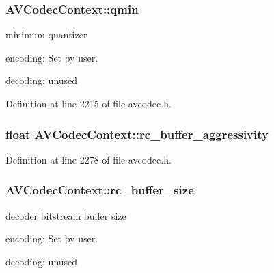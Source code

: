 \subsubsection[{\texorpdfstring{qmin}{qmin}}]{ A\+V\+Codec\+Context\+::qmin}\hypertarget{struct_a_v_codec_context_a3f63bc9141e25bf7f1cda0cef7cd4a60}{}\label{struct_a_v_codec_context_a3f63bc9141e25bf7f1cda0cef7cd4a60}
minimum quantizer
\begin{DoxyItemize}
\item encoding\+: Set by user.
\item decoding\+: unused 
\end{DoxyItemize}

Definition at line 2215 of file avcodec.\+h.

\subsubsection[{\texorpdfstring{rc\+\_\+buffer\+\_\+aggressivity}{rc_buffer_aggressivity}}]{\setlength{\rightskip}{0pt plus 5cm}float A\+V\+Codec\+Context\+::rc\+\_\+buffer\+\_\+aggressivity}\hypertarget{struct_a_v_codec_context_a61eb50e6362b69b6efdf0031b79f2395}{}\label{struct_a_v_codec_context_a61eb50e6362b69b6efdf0031b79f2395}


Definition at line 2278 of file avcodec.\+h.

\subsubsection[{\texorpdfstring{rc\+\_\+buffer\+\_\+size}{rc_buffer_size}}]{ A\+V\+Codec\+Context\+::rc\+\_\+buffer\+\_\+size}\hypertarget{struct_a_v_codec_context_a15000607a7e2371162348bb35b0184c1}{}\label{struct_a_v_codec_context_a15000607a7e2371162348bb35b0184c1}
decoder bitstream buffer size
\begin{DoxyItemize}
\item encoding\+: Set by user.
\item decoding\+: unused 
\end{DoxyItemize}

